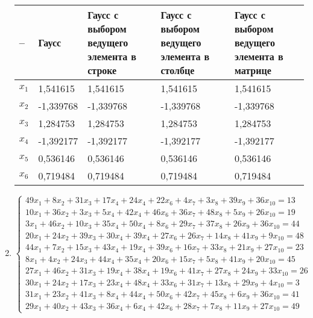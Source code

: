 \documentclass[14pt, a4paper]{extarticle}
\begin{document}
\begin{enumerate}
		 		\begin{tabular}{ |P{1em}|P{7em}|P{7em}|P{7em}|P{7em}| }
		 			\hline
		 			-- & Гаусс & Гаусс с выбором ведущего элемента в строке & Гаусс с выбором ведущего элемента в столбце&Гаусс с выбором ведущего элемента в матрице\\
		 			\hline
		 			$x_1$ & 1,541615 &  1,541615 & 1,541615 & 1,541615\\
		 			\hline 
		 			$x_2$ & -1,339768 &  -1,339768 & -1,339768 & -1,339768\\
		 			\hline
		 			$x_3$ & 1,284753 &  1,284753 & 1,284753 & 1,284753\\
		 			\hline
		 			$x_4$ & -1,392177 &  -1,392177 & -1,392177 & -1,392177\\
		 			\hline
		 			$x_5$ & 0,536146 &  0,536146 & 0,536146 & 0,536146\\
		 			\hline
		 			$x_6$ & 0,719484 &  0,719484 & 0,719484 & 0,719484\\
		 			\hline
		 		\end{tabular} 
			 \item $\begin{cases} 
			 			49x_1 + 8x_2 + 31x_3 + 17x_4 + 24x_4 + 22x_6 + 4x_7 + 3x_8 + 39x_9 + 36x_10 = 13\\
			 			10x_1 + 36x_2 + 3x_3 + 5x_4 + 42x_4 + 46x_6 + 36x_7 + 48x_8 + 5x_9 + 26x_10 = 19\\
			 			3x_1 + 46x_2 + 10x_3 + 35x_4 + 50x_4 + 8x_6 + 29x_7 + 37x_8 + 26x_9 + 36x_10 = 44\\
			 			20x_1 + 24x_2 + 39x_3 + 30x_4 + 39x_4 + 27x_6 + 26x_7 + 14x_8 + 41x_9 + 9x_10 = 48\\
			 			44x_1 + 7x_2 + 15x_3 + 43x_4 + 19x_4 + 39x_6 + 16x_7 + 33x_8 + 21x_9 + 27x_10 = 23\\
			 			8x_1 + 4x_2 + 24x_3 + 44x_4 + 35x_4 + 20x_6 + 15x_7 + 5x_8 + 41x_9 + 20x_10 = 45\\
			 			27x_1 + 46x_2 + 31x_3 + 19x_4 + 38x_4 + 19x_6 + 41x_7 + 27x_8 + 24x_9 + 33x_10 = 26\\
			 			30x_1 + 24x_2 + 17x_3 + 23x_4 + 48x_4 + 33x_6 + 31x_7 + 13x_8 + 29x_9 + 4x_10 = 3\\
			 			31x_1 + 23x_2 + 41x_3 + 8x_4 + 44x_4 + 50x_6 + 42x_7 + 45x_8 + 6x_9 + 36x_10 = 41\\
			 			29x_1 + 40x_2 + 43x_3 + 36x_4 + 6x_4 + 42x_6 + 28x_7 + 7x_8 + 11x_9 + 27x_10 = 49
			 		\end{cases}$
		 			\begin{tabular}{ |P{1em}|P{7em}|P{7em}|P{7em}|P{7em}| }
			 			\hline

\end{tabular}
\end{enumerate}
\end{document}
